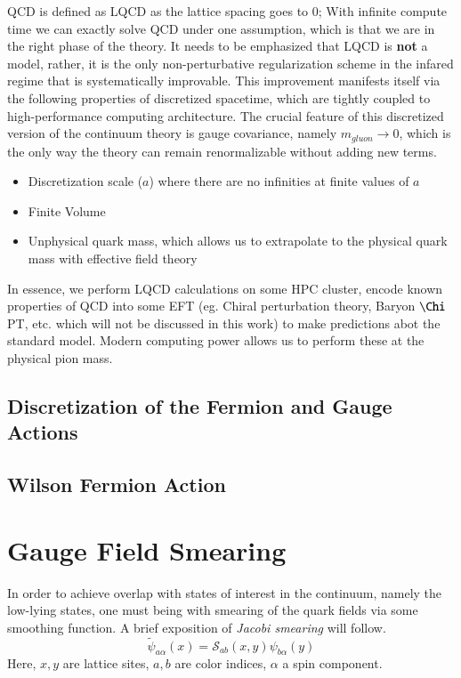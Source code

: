 QCD is defined as LQCD as the lattice spacing goes to 0; With infinite compute time we can exactly solve QCD under one assumption, which is that we are in the right phase of the theory. It needs to be emphasized that LQCD is \textbf{not} a model, rather, it is the only non-perturbative regularization scheme in the infared regime that is systematically improvable. This improvement manifests itself via the following properties of discretized spacetime, which are tightly coupled to high-performance computing architecture. The crucial feature of this discretized version of the continuum theory is gauge covariance, namely $m_{gluon} \rightarrow 0$, which is the only way the theory can remain renormalizable without adding new terms. 
\begin{itemize}
    \item Discretization scale ($a$) where there are no infinities at finite values of $a$
    \item Finite Volume 
    \item Unphysical quark mass, which allows us to extrapolate to the physical quark mass with effective field theory 
\end{itemize}

In essence, we perform LQCD calculations on some HPC cluster, encode known properties of QCD into some EFT (eg. Chiral perturbation theory, Baryon $\Chi$PT, etc. which will not be discussed in this work) to make predictions abot the standard model. Modern computing power allows us to perform these at the physical pion mass. 
\subsection{Discretization of the Fermion and Gauge Actions}

\subsection{Wilson Fermion Action}

\section{Gauge Field Smearing}
In order to achieve overlap with states of interest in the continuum, namely the low-lying states, one must being with smearing of the quark fields via some smoothing function. A brief exposition of \textit{Jacobi smearing} will follow. 
\begin{equation}
    \tilde{\psi}_{a\alpha}(x) = \mathcal{S}_{ab}(x,y) \psi_{b\alpha}(y)
\end{equation}
Here, $x,y$ are lattice sites, $a,b$ are color indices, $\alpha$ a spin component. 

